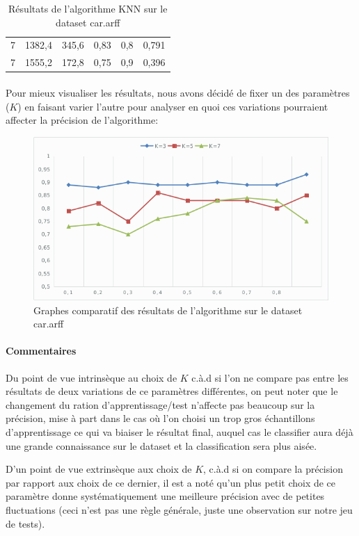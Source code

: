 \begin{table}[H]
\begin{tabular}{|c|c|c|c|c|c|}
					7          & 1382,4                                                                         & 345,6                                                                 & 0,83               & 0,8            & 0,791             \\
					7          & 1555,2                                                                         & 172,8                                                                 & 0,75               & 0,9            & 0,396             \\ \hline
				\end{tabular}
				\caption{Résultats de l'algorithme KNN sur le dataset car.arff}
			\end{table}
		\paragraph{}
		 Pour mieux visualiser les résultats, nous avons décidé de fixer un des paramètres ($K$) en faisant varier l'autre pour analyser en quoi ces variations pourraient affecter la précision de l'algorithme: 
		 \begin{figure}[H]
		 	\centering
		 	\includegraphics[width=0.75\linewidth]{knn/images/graph_car.png}
		 	\caption{Graphes comparatif des résultats de l'algorithme sur le dataset car.arff}
		 \end{figure}
	 	\paragraph{Commentaires}
	 		Du point de vue intrinsèque au choix de $K$ c.à.d si l'on ne compare pas entre les résultats de deux variations de ce paramètres différentes, on peut noter que le changement du ration d'apprentissage/test n'affecte pas beaucoup sur la précision, mise à part dans le cas où l'on choisi un trop gros échantillons d'apprentissage ce qui va biaiser le résultat final, auquel cas le classifier aura déjà une grande connaissance sur le dataset et la classification sera plus aisée.
	 		\par
	 		D'un point de vue extrinsèque aux choix de $K$, c.à.d si on compare la précision par rapport aux choix de ce dernier, il est a noté qu'un plus petit choix de ce paramètre donne systématiquement une meilleure précision avec de petites fluctuations (ceci n'est pas une règle générale, juste une observation sur notre jeu de tests). 
	 	
